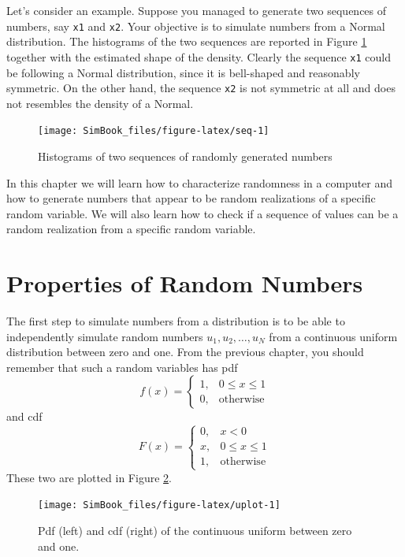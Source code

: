 \documentclass[
]{book}
\begin{document}
Let's consider an example. Suppose you managed to generate two sequences of numbers, say \texttt{x1} and \texttt{x2}. Your objective is to simulate numbers from a Normal distribution. The histograms of the two sequences are reported in Figure \ref{fig:seq} together with the estimated shape of the density. Clearly the sequence \texttt{x1} could be following a Normal distribution, since it is bell-shaped and reasonably symmetric. On the other hand, the sequence \texttt{x2} is not symmetric at all and does not resembles the density of a Normal.

\begin{figure}

{\centering \texttt{[image: SimBook\_files/figure-latex/seq-1]} 

}

\caption{Histograms of two sequences of randomly generated numbers}\label{fig:seq}
\end{figure}

In this chapter we will learn how to characterize randomness in a computer and how to generate numbers that appear to be random realizations of a specific random variable. We will also learn how to check if a sequence of values can be a random realization from a specific random variable.

\hypertarget{properties-of-random-numbers}{%
\section{Properties of Random Numbers}\label{properties-of-random-numbers}}

The first step to simulate numbers from a distribution is to be able to independently simulate random numbers \(u_1,u_2,\dots,u_N\) from a continuous uniform distribution between zero and one. From the previous chapter, you should remember that such a random variables has pdf
\[
f(x)=\left\{
\begin{array}{ll}
1, & 0\leq x \leq 1\\
0, &\mbox{otherwise}
\end{array}
\right.
\]
and cdf
\[
F(x)=\left\{
\begin{array}{ll}
0, & x<0\\
x, & 0\leq x \leq 1\\
1, &\mbox{otherwise}
\end{array}
\right.
\]
These two are plotted in Figure \ref{fig:uplot}.

\begin{figure}

{\centering \texttt{[image: SimBook\_files/figure-latex/uplot-1]} 

}

\caption{Pdf (left) and cdf (right) of the continuous uniform between zero and one.}\label{fig:uplot}
\end{figure}
\end{document}
